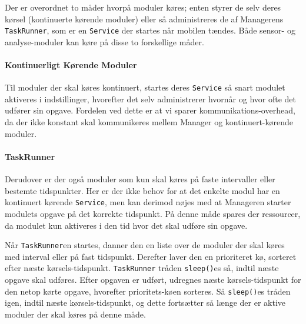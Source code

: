 Der er overordnet to måder hvorpå moduler køres; enten styrer de selv deres kørsel (kontinuerte kørende moduler) eller så administreres de af Managerens \texttt{TaskRunner}, som er en \texttt{Service} der startes når mobilen tændes.
Både sensor- og analyse-moduler kan køre på disse to forskellige måder.

\paragraph{Kontinuerligt Kørende Moduler}
Til moduler der skal køres kontinuert, startes deres \texttt{Service} så snart modulet aktiveres i indstillinger, hvorefter det selv administrerer hvornår og hvor ofte det udfører sin opgave.
Fordelen ved dette er at vi sparer kommunikations-overhead, da der ikke konstant skal kommunikeres mellem Manager og kontinuert-kørende moduler.

\paragraph{TaskRunner}
Derudover er der også moduler som kun skal køres på faste intervaller eller bestemte tidspunkter.
Her er der ikke behov for at det enkelte modul har en kontinuert kørende \texttt{Service}, men kan derimod nøjes med at Manageren starter modulets opgave på det korrekte tidspunkt.
På denne måde spares der ressourcer, da modulet kun aktiveres i den tid hvor det skal udføre sin opgave. 

Når \texttt{TaskRunner}en startes, danner den en liste over de moduler der skal køres med interval eller på fast tidspunkt.
Derefter laver den en prioriteret kø, sorteret efter næste kørsels-tidspunkt.
\texttt{TaskRunner} tråden \texttt{sleep()}es så, indtil næste opgave skal udføres.
Efter opgaven er udført, udregnes næste kørsels-tidspunkt for den netop kørte opgave, hvorefter prioritets-køen sorteres.
Så \texttt{sleep()}es tråden igen, indtil næste kørsels-tidspunkt, og dette fortsætter så længe der er aktive moduler der skal køres på denne måde.
